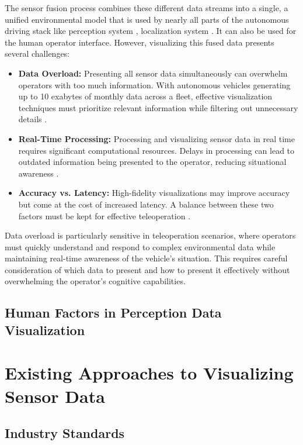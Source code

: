The sensor fusion process combines these different data streams into a single, a unified environmental
model that is used by nearly all parts of the autonomous driving stack like perception system \cite{feng2020deep}
, localization system \cite{feng2020deep, el-sheimy2020sensorfusion}. It can also be used for the human operator interface.
However, visualizing this fused data presents several challenges:
\begin{itemize}
    \item \textbf{Data Overload:} Presenting all sensor data simultaneously can overwhelm operators with too much information. With autonomous vehicles generating up to 10 exabytes of monthly data across a fleet, effective visualization techniques must prioritize relevant information while filtering out unnecessary details \cite{visualcapitalist2024}. %
    \item \textbf{Real-Time Processing:} Processing and visualizing sensor data in real time requires significant computational resources. Delays in processing can lead to outdated information being presented to the operator, reducing situational awareness \cite{Gnatzig}.
    \item \textbf{Accuracy vs. Latency:} High-fidelity visualizations may improve accuracy but come at the cost of increased latency. A balance between these two factors must be kept for effective teleoperation \cite{chucholowski2014teleoperated}.
\end{itemize}

Data overload is particularly sensitive in teleoperation scenarios, where operators must quickly understand and respond to complex environmental data while maintaining real-time awareness of the vehicle's situation. This requires careful consideration of which data to present and how to present it effectively without overwhelming the operator's cognitive capabilities.

\subsection{Human Factors in Perception Data Visualization}

\section{Existing Approaches to Visualizing Sensor Data}
\subsection{Industry Standards}
